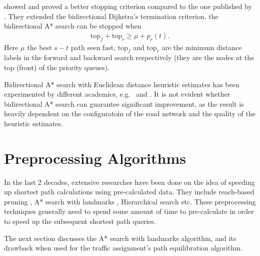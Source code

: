 \citet{GoldbergEPP} showed and proved a better stopping criterion compared to the one published by \citet{Pohl}.
They extended the bidirectional Dijkstra's termination criterion,
the bidirectional A* search can be stopped when
\begin{align}
    \text{top}_f + \text{top}_r \geq \mu + p_r(t).
\end{align}
Here $\mu$ the best $s-t$ path seen fast,
$\text{top}_f$ and $\text{top}_r$ are the minimum distance labels in the forward and backward search respectively (they are the nodes at the top (front) of the priority queues).

Bidirectional A* search with Euclidean distance heuristic estimates has been experimented by different academics, e.g.\ \citet{Klunder} and \citet{Goldberg05}.
It is not evident whether bidirectional A* search can guarantee significant improvement,
as the result is heavily dependent on the configuratoin of the road network and the quality of the heuristic estimates.

\section{Preprocessing Algorithms}
In the last 2 decades,
extensive researches have been done on the idea of speeding up shortest path calculations using pre-calculated data.
They include reach-based pruning \citep{Goldberg}, A* search with landmarks \citep{GoldbergLandmarks}, Hierarchical search \citep{Ertl1998, Pearson} etc.
These preprocessing techniques generally need to spend some amount of time to pre-calculate in order to speed up the subsequent shortest path queries.

The next section discusses the A* search with landmarks algorithm,
and its drawback when used for the traffic assignment's path equilibration algorithm.

